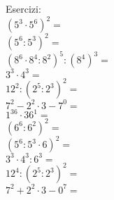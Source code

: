 \documentclass[14pt]{extarticle}
\begin{document}
%

\begin{spacing}{1.5}
Esercizi:\\
\((5^3\cdot5^6)^2=\)\\
\((5^6:5^3)^2=\)\\
\((8^6\cdot8^4:8^2)^5:(8^4)^3=\)\\
\(3^3\cdot4^3=\)\\
\(12^2:(2^5:2^3)^2=\)\\
\(7^2-2^2\cdot3-7^0=\)\\
\(1^{36}\cdot36^1=\)\\
\((6^6:6^2)^2=\)\\
\((5^6:5^3\cdot6)^2=\)\\
\(3^3\cdot4^3:6^3=\)\\
\(12^{4}:(2^5:2^3)^2=\)\\
\(7^2+2^2\cdot3-0^7=\)\\
\end{spacing}
\end{document}
